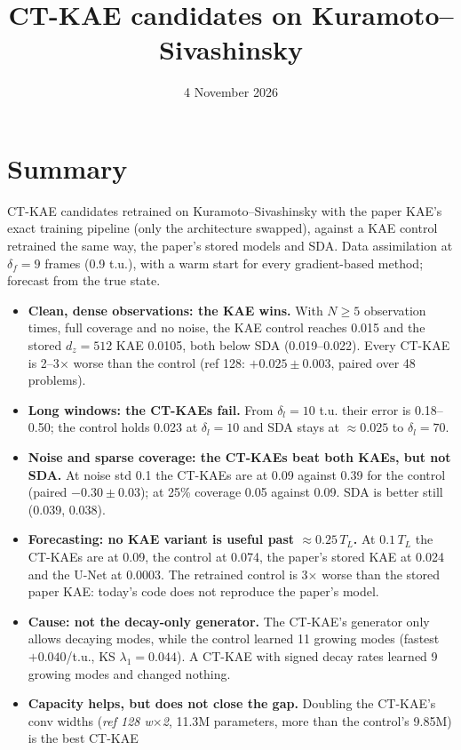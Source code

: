 \documentclass[10pt]{article}
\title{\textbf{CT-KAE candidates on Kuramoto--Sivashinsky}}
\date{4 November 2026}
\author{}
\begin{document}
\maketitle
\vspace{-2.5em}

\section*{Summary}
CT-KAE candidates retrained on Kuramoto--Sivashinsky with the paper KAE's exact training
pipeline (only the architecture swapped), against a KAE control retrained the same way, the
paper's stored models and SDA. Data assimilation at $\delta_f = 9$ frames (0.9 t.u.), with a warm
start for every gradient-based method; forecast from the true state.
\begin{itemize}\itemsep1pt
\item \textbf{Clean, dense observations: the KAE wins.} With $N \ge 5$ observation times, full
  coverage and no noise, the KAE control reaches 0.015 and the stored $d_z = 512$ KAE 0.0105, both
  below SDA (0.019--0.022). Every CT-KAE is 2--3$\times$ worse than the control (ref 128: $+0.025 \pm
  0.003$, paired over 48 problems).
\item \textbf{Long windows: the CT-KAEs fail.} From $\delta_l = 10$ t.u. their error is 0.18--0.50;
  the control holds 0.023 at $\delta_l = 10$ and SDA stays at $\approx 0.025$ to $\delta_l = 70$.
\item \textbf{Noise and sparse coverage: the CT-KAEs beat both KAEs, but not SDA.} At noise std 0.1
  the CT-KAEs are at 0.09 against 0.39 for the control (paired $-0.30 \pm 0.03$); at 25\% coverage
  0.05 against 0.09. SDA is better still (0.039, 0.038).
\item \textbf{Forecasting: no KAE variant is useful past $\approx 0.25\,T_L$.} At $0.1\,T_L$ the
  CT-KAEs are at 0.09, the control at 0.074, the paper's stored KAE at 0.024 and the U-Net at 0.0003.
  The retrained control is 3$\times$ worse than the stored paper KAE: today's code does not
  reproduce the paper's model.
\item \textbf{Cause: not the decay-only generator.} The CT-KAE's generator only allows decaying
  modes, while the control learned 11 growing modes (fastest $+0.040$/t.u., KS $\lambda_1 = 0.044$).
  A CT-KAE with signed decay rates learned 9 growing modes and changed nothing.
\item \textbf{Capacity helps, but does not close the gap.} Doubling the CT-KAE's conv widths
  (\emph{ref 128 w$\times$2}, 11.3M parameters, more than the control's 9.85M) is the best CT-KAE

\end{itemize}
\end{document}
